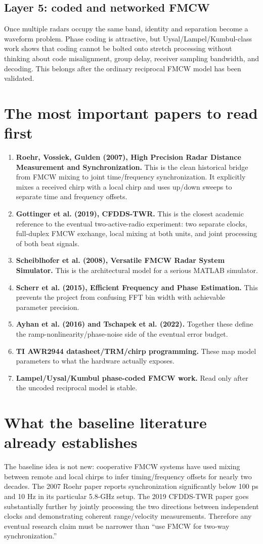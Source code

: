 \documentclass[11pt]{article}
\begin{document}
\subsection{Layer 5: coded and networked FMCW}
Once multiple radars occupy the same band, identity and separation become a waveform problem. Phase coding is attractive, but Uysal/Lampel/Kumbul-class work shows that coding cannot be bolted onto stretch processing without thinking about code misalignment, group delay, receiver sampling bandwidth, and decoding. This belongs after the ordinary reciprocal FMCW model has been validated.

\section{The most important papers to read first}
\begin{enumerate}
\item \textbf{Roehr, Vossiek, Gulden (2007), High Precision Radar Distance Measurement and Synchronization.} This is the clean historical bridge from FMCW mixing to joint time/frequency synchronization. It explicitly mixes a received chirp with a local chirp and uses up/down sweeps to separate time and frequency offsets.
\item \textbf{Gottinger et al. (2019), CFDDS-TWR.} This is the closest academic reference to the eventual two-active-radio experiment: two separate clocks, full-duplex FMCW exchange, local mixing at both units, and joint processing of both beat signals.
\item \textbf{Scheiblhofer et al. (2008), Versatile FMCW Radar System Simulator.} This is the architectural model for a serious MATLAB simulator.
\item \textbf{Scherr et al. (2015), Efficient Frequency and Phase Estimation.} This prevents the project from confusing FFT bin width with achievable parameter precision.
\item \textbf{Ayhan et al. (2016) and Tschapek et al. (2022).} Together these define the ramp-nonlinearity/phase-noise side of the eventual error budget.
\item \textbf{TI AWR2944 datasheet/TRM/chirp programming.} These map model parameters to what the hardware actually exposes.
\item \textbf{Lampel/Uysal/Kumbul phase-coded FMCW work.} Read only after the uncoded reciprocal model is stable.
\end{enumerate}

\section{What the baseline literature already establishes}
The baseline idea is not new: cooperative FMCW systems have used mixing between remote and local chirps to infer timing/frequency offsets for nearly two decades. The 2007 Roehr paper reports synchronization significantly below 100 ps and 10 Hz in its particular 5.8-GHz setup. The 2019 CFDDS-TWR paper goes substantially further by jointly processing the two directions between independent clocks and demonstrating coherent range/velocity measurements. Therefore any eventual research claim must be narrower than ``use FMCW for two-way synchronization.''
\end{document}
